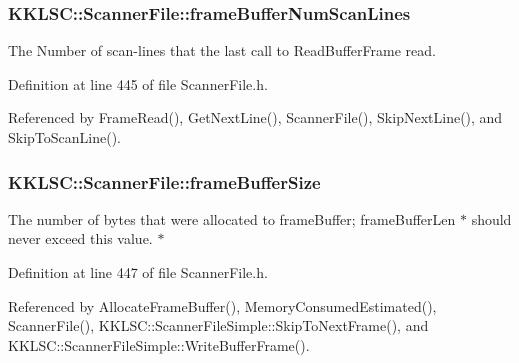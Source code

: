 \subsubsection[{\texorpdfstring{frame\+Buffer\+Num\+Scan\+Lines}{frameBufferNumScanLines}}]{ K\+K\+L\+S\+C\+::\+Scanner\+File\+::frame\+Buffer\+Num\+Scan\+Lines\hspace{0.3cm}{\ttfamily [protected]}}\hypertarget{class_k_k_l_s_c_1_1_scanner_file_a23700be8017b18a9670d92938c72d74b}{}\label{class_k_k_l_s_c_1_1_scanner_file_a23700be8017b18a9670d92938c72d74b}
The Number of scan-\/lines that the last call to \textquotesingle{}Read\+Buffer\+Frame\textquotesingle{} read. 

Definition at line 445 of file Scanner\+File.\+h.



Referenced by Frame\+Read(), Get\+Next\+Line(), Scanner\+File(), Skip\+Next\+Line(), and Skip\+To\+Scan\+Line().

\subsubsection[{\texorpdfstring{frame\+Buffer\+Size}{frameBufferSize}}]{ K\+K\+L\+S\+C\+::\+Scanner\+File\+::frame\+Buffer\+Size\hspace{0.3cm}{\ttfamily [protected]}}\hypertarget{class_k_k_l_s_c_1_1_scanner_file_a101cdb2a0320f6aaefcabadc585beb34}{}\label{class_k_k_l_s_c_1_1_scanner_file_a101cdb2a0320f6aaefcabadc585beb34}
The number of bytes that were allocated to \textquotesingle{}frame\+Buffer\textquotesingle{}; \textquotesingle{}frame\+Buffer\+Len\textquotesingle{} $\ast$ should never exceed this value. $\ast$ 

Definition at line 447 of file Scanner\+File.\+h.



Referenced by Allocate\+Frame\+Buffer(), Memory\+Consumed\+Estimated(), Scanner\+File(), K\+K\+L\+S\+C\+::\+Scanner\+File\+Simple\+::\+Skip\+To\+Next\+Frame(), and K\+K\+L\+S\+C\+::\+Scanner\+File\+Simple\+::\+Write\+Buffer\+Frame().

